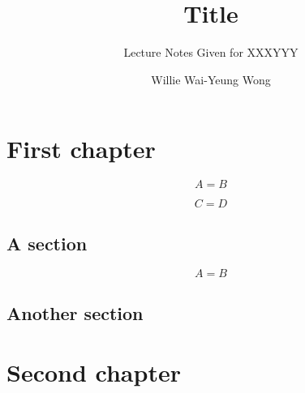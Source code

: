 \documentclass[noocg]{wwwnotes2}
\title{Title}
\subtitle{Lecture Notes Given for XXXYYY}
\author{Willie Wai-Yeung Wong}
\begin{document}
\maketitle

\begin{abstract}
	\lipsum[3]
\end{abstract}

\tableofcontents

\chapter{First chapter}

\lipsum[1-2]

\begin{equation}
	A = B
\end{equation}

\begin{thm}
	\lipsum[27]
\end{thm}

\lipsum[1-3]

\begin{rmk}
	\lipsum[27]
\end{rmk}

\begin{equation}
	C = D
\end{equation}

\section{A section}
\lipsum[2]

\begin{equation}
	A = B
\end{equation}

\lipsum[3-8]



\section{Another section}

\lipsum[5-9]

\chapter{Second chapter}

\lipsum[10-13]


\cleardoublepage
{}
{}


\end{document}
